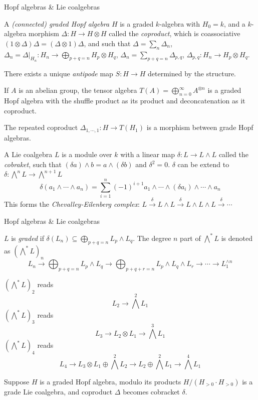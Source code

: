 \documentclass[8pt]{beamer}
\theoremstyle{definition}
\theoremstyle{remark}
\begin{document}
\begin{frame}[t]{Hopf algebras \& Lie coalgebras}
\begin{definition}
A \textit{(connected) graded Hopf algebra} $H$ is a graded $k$-algebra with $H_0=k$, and a $k$-algebra morphism $\Delta:H\to H\otimes H$ called the \textit{coproduct}, which is coassociative $(1\otimes\Delta)\Delta=(\Delta\otimes1)\Delta$, and such that  $\Delta=\sum_n\Delta_n$, $\Delta_n=\Delta|_{H_n}:H_n\to\bigoplus\limits_{p+q=n}H_p\otimes H_q$, $\Delta_n=\sum\limits_{p+q=n}\Delta_{p,q}$, $\Delta_{p,q}:H_n\to H_p\otimes H_q$.

There exists a unique \textit{antipode} map $S:H\to H$ determined by the structure.
\end{definition}

If $A$ is an abelian group, the tensor algebra $T(A)=\bigoplus_{n=0}^\infty A^{\otimes n}$ is a graded Hopf algebra with the shuffle product as its product and deconcatenation as it coproduct.
\vspace{10pt}

The repeated coproduct $\Delta_{1,\cdots,1}:H\to T(H_1)$ is a morphism between grade Hopf algebras.

\begin{definition}
A Lie coalgebra $L$ is a module over $k$ with a linear map $\delta:L\to L\wedge L$ called the \textit{cobraket}, such that $(\delta a)\wedge b=a\wedge(\delta b)$ and $\delta^2=0$. $\delta$ can be extend to $\delta:\bigwedge^nL\to\bigwedge^{n+1}L$
\begin{equation}
\delta(a_1\wedge\cdots\wedge a_n)=\sum_{i=1}^n(-1)^{i+1}a_1\wedge\cdots\wedge(\delta a_i)\wedge\cdots\wedge a_n
\end{equation}
This forms the \textit{Chevalley-Eilenberg complex}: $L\xrightarrow{\delta}L\wedge L\xrightarrow{\delta}L\wedge L\wedge L\xrightarrow{\delta}\cdots$
\end{definition}
\end{frame}

\begin{frame}[t]{Hopf algebras \& Lie coalgebras}
\begin{definition}
$L$ is \textit{graded} if $\delta(L_n)\subseteq\bigoplus_{p+q=n}L_p\wedge L_q$. The degree $n$ part of $\bigwedge^* L$ is denoted as $\left(\bigwedge^* L\right)_n$
$$
L_n\to \bigoplus_{p+q=n}L_p\wedge L_q\to \bigoplus_{p+q+r=n}L_p\wedge L_q\wedge L_r\to\cdots\to L_1^{\wedge n}
$$
\end{definition}

\begin{example}
$\left(\bigwedge^* L\right)_2$ reads
\[
L_2\to\textstyle\bigwedge^2L_1
\]
$\left(\bigwedge^* L\right)_3$ reads
\[
L_3\to L_2\otimes L_1\to\textstyle\bigwedge^3L_1
\]
$\left(\bigwedge^* L\right)_4$ reads
\[
L_4\to L_3\otimes L_1\oplus\textstyle\bigwedge^2L_2\to L_2\oplus\bigwedge^2L_1\to\bigwedge^4L_1
\]
\end{example}

Suppose $H$ is a graded Hopf algebra, modulo its products $H/(H_{>0}\cdot H_{>0})$ is a grade Lie coalgebra, and coproduct $\Delta$ becomes cobracket $\delta$.
\end{frame}
\end{document}
